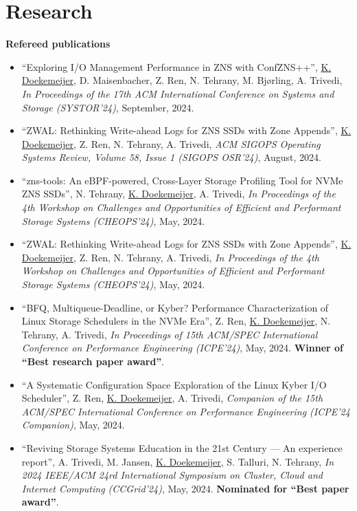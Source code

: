 \documentclass[letterpaper,11pt]{article}
\begin{document}
\section{Research}

\textbf{Refereed publications}
\begin{itemize}[label={}]
\item
  ``Exploring I/O Management Performance in ZNS with ConfZNS++'', 
  \underline{K. Doekemeijer}, D. Maisenbacher, Z. Ren, N. Tehrany, M. Bjørling, A. Trivedi,
  \textit{In Proceedings of the 17th ACM International Conference on Systems and Storage (SYSTOR'24)}, 
  September, 2024.

\item
  ``ZWAL: Rethinking Write-ahead Logs for ZNS SSDs with Zone Appends'', 
  \underline{K. Doekemeijer}, Z. Ren, N. Tehrany, A. Trivedi,
  \textit{ACM SIGOPS Operating Systems Review, Volume 58, Issue 1 (SIGOPS OSR'24)}, 
  August, 2024.

\item
  ``zns-tools: An eBPF-powered, Cross-Layer Storage Profiling Tool for NVMe ZNS SSDs'', 
  N. Tehrany, \underline{K. Doekemeijer}, A. Trivedi,
  \textit{In Proceedings of the 4th Workshop on Challenges and Opportunities of Efficient and Performant Storage Systems (CHEOPS'24)},
  May, 2024.

\item
  ``ZWAL: Rethinking Write-ahead Logs for ZNS SSDs with Zone Appends'', 
  \underline{K. Doekemeijer}, Z. Ren, N. Tehrany, A. Trivedi,
  \textit{In Proceedings of the 4th Workshop on Challenges and Opportunities of Efficient and Performant Storage Systems (CHEOPS'24)}, 
  May, 2024.

\item
  ``BFQ, Multiqueue-Deadline, or Kyber? Performance Characterization of Linux Storage Schedulers in the NVMe Era'', 
  Z. Ren, \underline{K. Doekemeijer}, N. Tehrany, A. Trivedi,
  \textit{In Proceedings of 15th ACM/SPEC International Conference on Performance Engineering (ICPE'24)}, 
  May, 2024. 
  \textbf{Winner of ``Best research paper award''}.

\item
  ``A Systematic Configuration Space Exploration of the Linux Kyber I/O Scheduler'', 
  Z. Ren, \underline{K. Doekemeijer}, A. Trivedi,
  \textit{Companion of the 15th ACM/SPEC International Conference on Performance Engineering (ICPE’24 Companion)}, 
  May, 2024.

\item
  ``Reviving Storage Systems Education in the 21st Century — An experience report'', 
  A. Trivedi, M. Jansen, \underline{K. Doekemeijer}, S. Talluri, N. Tehrany,
  \textit{In 2024 IEEE/ACM 24rd International Symposium on Cluster, Cloud and Internet Computing (CCGrid'24)}, 
  May, 2024. 
  \textbf{Nominated for ``Best paper award''}.


\end{itemize}
\end{document}
